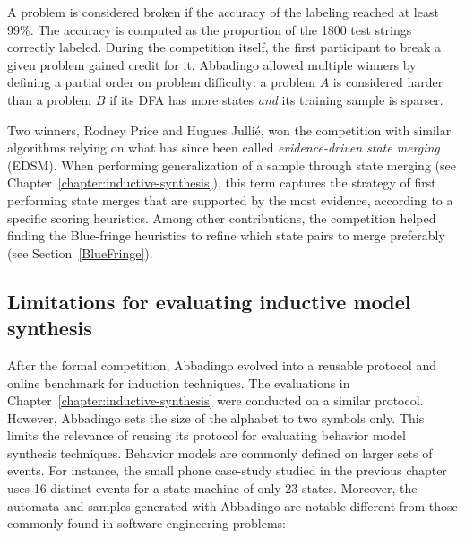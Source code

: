 A problem is considered broken if the accuracy of the labeling reached at least 99\%. The accuracy is computed as the proportion of the 1800 test strings correctly labeled. During the competition itself, the first participant to break a given problem gained credit for it. Abbadingo allowed multiple winners by defining a partial order on problem difficulty: a problem $A$ is considered harder than a problem $B$ if its DFA has more states \emph{and} its training sample is sparser. 

Two winners, Rodney Price and Hugues Julli\'e, won the competition with similar algorithms relying on what has since been called \emph{evidence-driven state merging} (EDSM). When performing generalization of a sample through state merging (see Chapter~\ref{chapter:inductive-synthesis}), this term captures the strategy of first performing state merges that are supported by the most evidence, according to a specific scoring heuristics. Among other contributions, the competition helped finding the Blue-fringe heuristics to refine which state pairs to merge preferably (see Section~\ref{BlueFringe}).

\subsection{Limitations for evaluating inductive model synthesis}

After the formal competition, Abbadingo evolved into a reusable protocol and online benchmark for induction techniques. The evaluations in Chapter~\ref{chapter:inductive-synthesis} were conducted on a similar protocol. However, Abbadingo sets the size of the alphabet to two symbols only. This limits the relevance of reusing its protocol for evaluating behavior model synthesis techniques. Behavior models are commonly defined on larger sets of events. For instance, the small phone case-study studied in the previous chapter uses 16 distinct events for a state machine of only 23 states. Moreover, the automata and samples generated with Abbadingo are notable different from those commonly found in software engineering problems:

